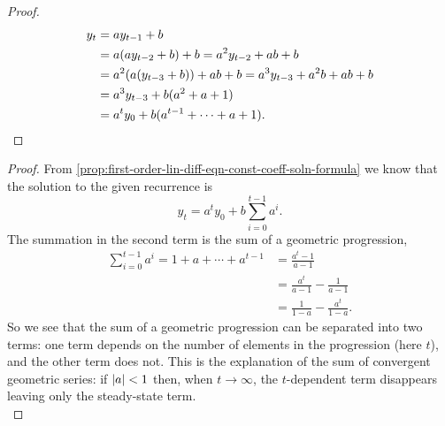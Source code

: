 \documentclass[MathsNotesBase.tex]{subfiles}
\begin{document}
{		\bigskip\medskip
		\begin{proof}
			\begin{align*}
			y_t &= a y_{t-1} + b \\
			&= a(a y_{t-2} + b) + b = a^2 y_{t-2} + ab + b\\
			&= a^2 (a(y_{t-3} + b)) + ab + b = a^3 y_{t-3} + a^2 b + ab + b \\
			&= a^3 y_{t-3} + b(a^2 + a + 1) \\
			&= a^t y_0 + b(a^{t-1} + \cdots + a + 1).  \qedhere  
			\end{align*}
		\end{proof}
	
		\bigskip\medskip
		\begin{proof}
			From \autoref{prop:first-order-lin-diff-eqn-const-coeff-soln-formula} we know that the solution to the given recurrence is
			\[ y_t = a^t y_0 + b \sum_{i=0}^{t-1} a^i. \]
			The summation in the second term is the sum of a geometric progression,
			\begin{align*}
			\sum_{i=0}^{t-1} a^i = 1 + a + \cdots + a^{t-1} &= \frac{a^t - 1}{a - 1} \\[8pt]
			&= \frac{a^t}{a - 1} - \frac{1}{a - 1} \\[8pt]
			&= \frac{1}{1 - a} - \frac{a^t}{1 - a}.
			\end{align*}
			So we see that the sum of a geometric progression can be separated into two terms: one term depends on the number of elements in the progression (here $t$), and the other term does not. This is the explanation of the sum of convergent geometric series: if ${ \left\lvert a\right\rvert < 1 }$ then, when ${ t \to \infty }$, the $t$-dependent term disappears leaving only the steady-state term.\\
			

\end{proof}}
\end{document}
